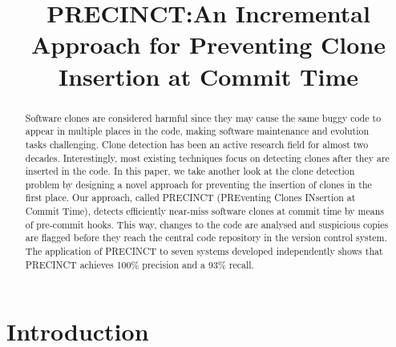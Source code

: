 \documentclass[conference]{IEEEtran}
\begin{document}
\title{PRECINCT:\@ An Incremental Approach for Preventing Clone Insertion at Commit Time}


\author{
\and
{}
}

\maketitle

\begin{abstract}
  Software clones are considered harmful since they may cause the same buggy code to appear in multiple places in the code, making software maintenance and evolution tasks challenging. Clone detection has been an active research field for almost two decades. Interestingly, most existing techniques focus on detecting clones after they are inserted in the code.  In this paper, we take another look at the clone detection problem by designing a novel approach for preventing the insertion of clones in the first place. Our approach, called PRECINCT (PREventing Clones INsertion at Commit Time),  detects efficiently  near-miss software clones at commit time by means of pre-commit hooks. This way, changes to the code are analysed and suspicious copies are flagged before they reach the central code repository in the version control system.  The application of PRECINCT to seven systems developed independently shows that PRECINCT achieves 100\% precision and a 93\% recall.



\end{abstract}


\IEEEpeerreviewmaketitle

\section{Introduction}
\label{sec:Introduction}
\end{document}

